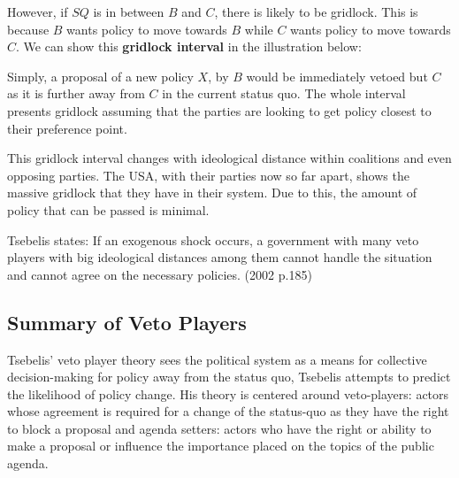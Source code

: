 \documentclass[12pt, letterpaper]{article}
\begin{document}
However, if $SQ$ is in between $B$ and $C$, there is likely to be gridlock. This is because $B$ wants policy to move towards $B$ while $C$ wants policy to move towards $C$. We can show this \textbf{gridlock interval} in the illustration below:
\begin{center}
\end{center}
Simply, a proposal of a new policy $X$, by $B$ would be immediately vetoed but $C$ as it is further away from $C$ in the current status quo. The whole interval presents gridlock assuming that the parties are looking to get policy closest to their preference point.

This gridlock interval changes with ideological distance within coalitions and even opposing parties. The USA, with their parties now so far apart, shows the massive gridlock that they have in their system. Due to this, the amount of policy that can be passed is minimal.
\begin{center}
Tsebelis states: If an exogenous shock occurs, a government with many veto players with big ideological distances among them cannot handle the situation and cannot agree on the necessary policies. (2002 p.185)
\end{center}

\subsection{Summary of Veto Players}
Tsebelis' veto player theory sees the political system as a means for collective decision-making for policy away from the status quo, Tsebelis attempts to predict the likelihood of policy change. His theory is centered around veto-players: actors whose agreement is required for a change of the status-quo as they have the right to block a proposal and agenda setters: actors who have the right or ability to make a proposal or influence the importance placed on the topics of the public agenda.
\end{document}
